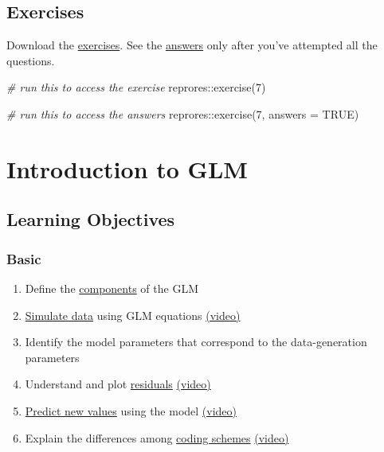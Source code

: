 \documentclass[
  oneside]{book}
\newenvironment{Shaded}{\begin{snugshade}}{\end{snugshade}}
\newcommand{\AttributeTok}[1]{\textcolor[rgb]{0.77,0.63,0.00}{#1}}
\newcommand{\CommentTok}[1]{\textcolor[rgb]{0.56,0.35,0.01}{\textit{#1}}}
\newcommand{\ConstantTok}[1]{\textcolor[rgb]{0.00,0.00,0.00}{#1}}
\newcommand{\DecValTok}[1]{\textcolor[rgb]{0.00,0.00,0.81}{#1}}
\newcommand{\FunctionTok}[1]{\textcolor[rgb]{0.00,0.00,0.00}{#1}}
\newcommand{\NormalTok}[1]{#1}
\newcommand{\SpecialCharTok}[1]{\textcolor[rgb]{0.00,0.00,0.00}{#1}}
\providecommand{\tightlist}{%
  \setlength{\itemsep}{0pt}\setlength{\parskip}{0pt}}
\begin{document}
\hypertarget{exercises-dplyr}{%
\section{Exercises}\label{exercises-dplyr}}

Download the \href{exercises/07_dplyr_exercise.Rmd}{exercises}. See the \href{exercises/07_dplyr_answers.Rmd}{answers} only after you've attempted all the questions.

\begin{Shaded}
\begin{Highlighting}[]
\CommentTok{\# run this to access the exercise}
\NormalTok{reprores}\SpecialCharTok{::}\FunctionTok{exercise}\NormalTok{(}\DecValTok{7}\NormalTok{)}

\CommentTok{\# run this to access the answers}
\NormalTok{reprores}\SpecialCharTok{::}\FunctionTok{exercise}\NormalTok{(}\DecValTok{7}\NormalTok{, }\AttributeTok{answers =} \ConstantTok{TRUE}\NormalTok{)}
\end{Highlighting}
\end{Shaded}

\hypertarget{glm}{%
\chapter{Introduction to GLM}\label{glm}}

\hypertarget{ilo9}{%
\section{Learning Objectives}\label{ilo9}}

\hypertarget{basic-4}{%
\subsection{Basic}\label{basic-4}}

\begin{enumerate}
\def\labelenumi{\arabic{enumi}.}
\tightlist
\item
  Define the \protect\hyperlink{glm-components}{components} of the GLM
\item
  \protect\hyperlink{sim-glm}{Simulate data} using GLM equations \href{https://youtu.be/JQ90LnVCbKc}{(video)}
\item
  Identify the model parameters that correspond to the data-generation parameters
\item
  Understand and plot \protect\hyperlink{residuals}{residuals} \href{https://youtu.be/sr-NtxiH2Qk}{(video)}
\item
  \protect\hyperlink{predict}{Predict new values} using the model \href{https://youtu.be/0o4LEbVVWfM}{(video)}
\item
  Explain the differences among \protect\hyperlink{coding-schemes}{coding schemes} \href{https://youtu.be/SqL28AbLj3g}{(video)}
\end{enumerate}
\end{document}
